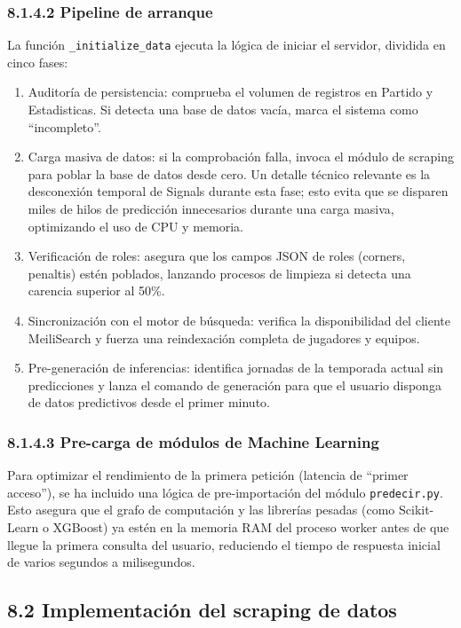 \subsubsection{8.1.4.2 Pipeline de arranque}

La función \texttt{\_initialize\_data} ejecuta la lógica de iniciar el servidor, dividida en cinco fases:

\begin{enumerate}
\item Auditoría de persistencia: comprueba el volumen de registros en Partido y Estadisticas. Si detecta una base de datos vacía, marca el sistema como ``incompleto''.
\item Carga masiva de datos: si la comprobación falla, invoca el módulo de scraping para poblar la base de datos desde cero. Un detalle técnico relevante es la desconexión temporal de Signals durante esta fase; esto evita que se disparen miles de hilos de predicción innecesarios durante una carga masiva, optimizando el uso de CPU y memoria.
\item Verificación de roles: asegura que los campos JSON de roles (corners, penaltis) estén poblados, lanzando procesos de limpieza si detecta una carencia superior al 50\%.
\item Sincronización con el motor de búsqueda: verifica la disponibilidad del cliente MeiliSearch y fuerza una reindexación completa de jugadores y equipos.
\item Pre-generación de inferencias: identifica jornadas de la temporada actual sin predicciones y lanza el comando de generación para que el usuario disponga de datos predictivos desde el primer minuto.
\end{enumerate}

\subsubsection{8.1.4.3 Pre-carga de módulos de Machine Learning}

Para optimizar el rendimiento de la primera petición (latencia de ``primer acceso''), se ha incluido una lógica de pre-importación del módulo \texttt{predecir.py}. 
Esto asegura que el grafo de computación y las librerías pesadas (como Scikit-Learn o XGBoost) ya estén en la memoria RAM del proceso worker antes de que llegue la 
primera consulta del usuario, reduciendo el tiempo de respuesta inicial de varios segundos a milisegundos.

\subsection{8.2 Implementación del scraping de datos}

